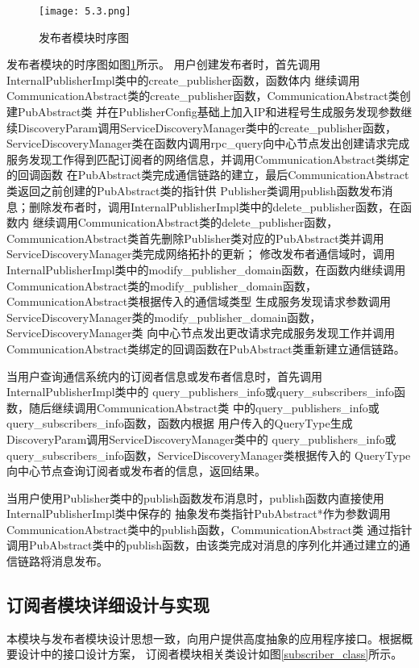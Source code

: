 \begin{figure}[H]
  \centering
  \texttt{[image: 5.3.png]}
  \caption{发布者模块时序图}
  \label{publisher_timesequence}
\end{figure}

发布者模块的时序图如图\ref{publisher_timesequence}所示。
用户创建发布者时，首先调用InternalPublisherImpl类中的create\_publisher函数，函数体内
继续调用CommunicationAbstract类的create\_publisher函数，CommunicationAbstract类创建PubAbstract类
并在PublisherConfig基础上加入IP和进程号生成服务发现参数继续DiscoveryParam调用ServiceDiscoveryManager类中的create\_publisher函数，
ServiceDiscoveryManager类在函数内调用rpc\_query向中心节点发出创建请求完成服务发现工作得到匹配订阅者的网络信息，并调用CommunicationAbstract类绑定的回调函数
在PubAbstract类完成通信链路的建立，最后CommunicationAbstract类返回之前创建的PubAbstract类的指针供
Publisher类调用publish函数发布消息；删除发布者时，调用InternalPublisherImpl类中的delete\_publisher函数，在函数内
继续调用CommunicationAbstract类的delete\_publisher函数，
CommunicationAbstract类首先删除Publisher类对应的PubAbstract类并调用ServiceDiscoveryManager类完成网络拓扑的更新；
修改发布者通信域时，调用InternalPublisherImpl类中的modify\_publisher\_domain函数，在函数内继续调用
CommunicationAbstract类的modify\_publisher\_domain函数，CommunicationAbstract类根据传入的通信域类型
生成服务发现请求参数调用ServiceDiscoveryManager类的modify\_publisher\_domain函数，ServiceDiscoveryManager类
向中心节点发出更改请求完成服务发现工作并调用CommunicationAbstract类绑定的回调函数在PubAbstract类重新建立通信链路。

当用户查询通信系统内的订阅者信息或发布者信息时，首先调用InternalPublisherImpl类中的
query\_publishers\_info或query\_subscribers\_info函数，随后继续调用CommunicationAbstract类
中的query\_publishers\_info或query\_subscribers\_info函数，函数内根据
用户传入的QueryType生成DiscoveryParam调用ServiceDiscoveryManager类中的
query\_publishers\_info或query\_subscribers\_info函数，ServiceDiscoveryManager类根据传入的
QueryType向中心节点查询订阅者或发布者的信息，返回结果。

当用户使用Publisher类中的publish函数发布消息时，publish函数内直接使用InternalPublisherImpl类中保存的
抽象发布类指针PubAbstract*作为参数调用CommunicationAbstract类中的publish函数，CommunicationAbstract类
通过指针调用PubAbstract类中的publish函数，由该类完成对消息的序列化并通过建立的通信链路将消息发布。

\subsection{订阅者模块详细设计与实现}
本模块与发布者模块设计思想一致，向用户提供高度抽象的应用程序接口。根据概要设计中的接口设计方案，
订阅者模块相关类设计如图\ref{subscriber_class}所示。

